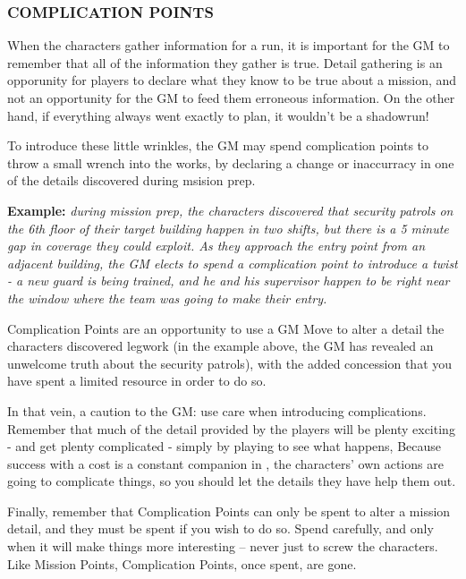 \documentclass[oneside,10pt]{article}
\begin{document}
\begin{multicols}{2}
\subsubsection{COMPLICATION POINTS}
When the characters gather information for a run, it is important for the GM to remember that all of the information they
gather is true. Detail gathering is an opporunity for players to
declare what they know to be true about a mission, and not
an opportunity for the GM to feed them erroneous information. On the other hand, if everything always went exactly to
plan, it wouldn’t be a shadowrun!

To introduce these little wrinkles, the GM may spend complication points to throw a small wrench into the works, by
declaring a change or inaccurracy in one of the
details discovered during msision prep.

\begin{adjustwidth*}{.5cm}{.5cm}
\textbf{Example:}\textit{ during mission prep, the characters discovered
that security patrols on the 6th floor of their target building happen in two shifts, but there is a 5 minute gap in
coverage they could exploit. As they approach the entry
point from an adjacent building, the GM elects to spend
a complication point to introduce a twist - a new guard
is being trained, and he and his supervisor happen to be
right near the window where the team was going to make
their entry.}
\end{adjustwidth*}

Complication Points are an opportunity to use a GM Move 
to alter a detail the characters discovered legwork (in the 
example above, the GM has revealed an unwelcome truth 
about the security patrols), with the added concession that 
you have spent a limited resource in order to do
so. 

In that vein, a caution to the GM: use care when introducing 
complications. Remember that much of the detail provided 
by the players will be plenty exciting - and get plenty complicated - simply by playing to see what happens, Because 
success with a cost is a constant companion in \SW{}, 
the characters’ own actions are going to complicate things, so 
  you should let the details they have help them
  out. 

Finally, remember that Complication Points can only be spent
to alter a mission detail, and they must be spent if you wish
to do so. Spend carefully, and only when it will make things
more interesting – never just to screw the characters.
Like Mission Points, Complication Points, once spent, are
gone.


\end{multicols}
\end{document}
